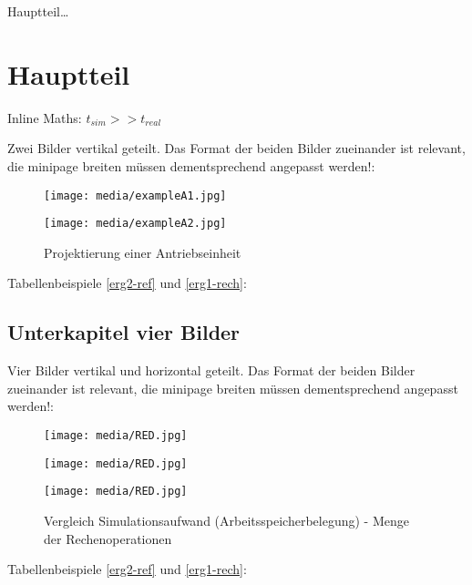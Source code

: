 \label{ch_creation}

Hauptteil\ldots

\section{Hauptteil}
Inline Maths: $t_{sim} >> t_{real}$

Zwei Bilder vertikal geteilt. Das Format der beiden Bilder zueinander ist relevant, die minipage breiten
müssen dementsprechend angepasst werden!:
\begin{figure}[h]
  \hfill
  \begin{minipage}[t]{0.65\textwidth}
    \texttt{[image: media/exampleA1.jpg]}
  \end{minipage}
  \hfill
  \begin{minipage}[t]{0.3\textwidth}
    \texttt{[image: media/exampleA2.jpg]}
  \end{minipage}
  \hfill
  \captionsetup{width=0.8\textwidth}
  \caption[Projektierung]{Projektierung einer Antriebseinheit}
  \label{antrieb1}
  \vspace{-0.4cm}
\end{figure}
Tabellenbeispiele \ref{erg2-ref} und \ref{erg1-rech}:

\newpage

\subsection{Unterkapitel vier Bilder}

Vier Bilder vertikal und horizontal geteilt. Das Format der beiden Bilder zueinander ist relevant, die minipage breiten
müssen dementsprechend angepasst werden!:
\begin{figure}[h]
  \hfill
  \begin{minipage}[t]{0.49\textwidth}
    \texttt{[image: media/RED.jpg]}
  \end{minipage}
  \hfill
  \begin{minipage}[t]{0.49\textwidth}
    \texttt{[image: media/RED.jpg]}
  \end{minipage}
  \hfill

  \vspace{0.01\textwidth}

  \hfill
  \begin{minipage}[b]{0.49\textwidth}
    \texttt{[image: media/RED.jpg]}
  \end{minipage}
  \hfill
  \begin{minipage}[b]{0.49\textwidth}
  \end{minipage}
  \hfill

  \captionsetup{width=0.8\textwidth}
  \caption[Vergleich Arbeitsspeicherbelegung - Rechenoperationen]{Vergleich Simulationsaufwand (Arbeitsspeicherbelegung) - Menge der Rechenoperationen}
  \label{vergleich1dot5}
  \vspace{-0.4cm}
\end{figure}
Tabellenbeispiele \ref{erg2-ref} und \ref{erg1-rech}:

